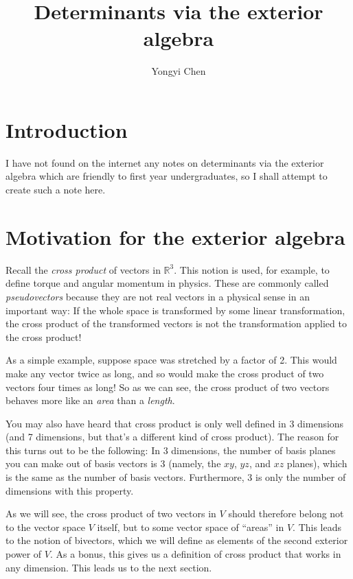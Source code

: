 \documentclass[11pt,oneside]{amsart}
\title{Determinants via the exterior algebra}
\author{Yongyi Chen}
\theoremstyle{definition}
\theoremstyle{plain}
\newcommand{\bR}{\mathbb{R}}
\begin{document}
\maketitle

\section{Introduction}
I have not found on the internet any notes on determinants via the exterior algebra which are friendly to first year undergraduates, so I shall attempt to create such a note here.

\section{Motivation for the exterior algebra}
Recall the \emph{cross product} of vectors in $\bR^3$. This notion is used, for example, to define torque and angular momentum in physics. These are commonly called \emph{pseudovectors} because they are not real vectors in a physical sense in an important way: If the whole space is transformed by some linear transformation, the cross product of the transformed vectors is not the transformation applied to the cross product!

As a simple example, suppose space was stretched by a factor of 2. This would make any vector twice as long, and so would make the cross product of two vectors four times as long! So as we can see, the cross product of two vectors behaves more like an \emph{area} than a \emph{length}.

You may also have heard that cross product is only well defined in 3 dimensions (and 7 dimensions, but that's a different kind of cross product). The reason for this turns out to be the following: In 3 dimensions, the number of basis planes you can make out of basis vectors is 3 (namely, the $xy$, $yz$, and $xz$ planes), which is the same as the number of basis vectors. Furthermore, 3 is only the number of dimensions with this property.

As we will see, the cross product of two vectors in $V$ should therefore belong not to the vector space $V$ itself, but to some vector space of ``areas'' in $V$. This leads to the notion of bivectors, which we will define as elements of the second exterior power of $V$. As a bonus, this gives us a definition of cross product that works in any dimension. This leads us to the next section.
\end{document}
